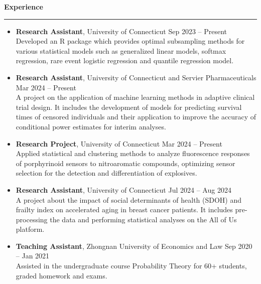 \documentclass[a4paper,10pt]{article}
\newcommand{\resheading}[1]{
  \vspace{8pt}
  \noindent\textbf{\large #1}
  \vspace{4pt}
  \hrule
  \vspace{8pt}
}
\begin{document}
\resheading{Experience}
\begin{itemize}[left=0pt, label={}]

    \item \textbf{Research Assistant}, University of Connecticut \hfill Sep 2023 -- Present \\
    Developed an R package which provides optimal subsampling methods for
various statistical models such as generalized linear models, softmax
regression, rare event logistic regression and quantile regression model.

    \item \textbf{Research Assistant}, University of Connecticut and Servier Pharmaceuticals \hfill Mar 2024 -- Present \\
    A project on the application of machine learning methods in adaptive
clinical trial design. It includes the development of models for predicting
survival times of censored individuals and their application to improve the
accuracy of conditional power estimates for interim analyses.

   \item \textbf{Research Project}, University of Connecticut \hfill Mar 2024 -- Present \\
Applied statistical and clustering methods to analyze fluorescence responses of porphyrinoid sensors to nitroaromatic compounds, optimizing sensor selection for the detection and differentiation of explosives.
      
    \item \textbf{Research Assistant}, University of Connecticut \hfill Jul 2024 -- Aug 2024 \\
    A project about the impact of social determinants of health (SDOH) and
frailty index on accelerated aging in breast cancer patients. It includes
pre-processing the data and performing statistical analyses on the All of Us
platform.
    
    \item \textbf{Teaching Assistant}, Zhongnan University of Economics and Law \hfill Sep 2020 -- Jan 2021 \\
    Assisted in the undergraduate course Probability Theory for 60+ students,
graded homework and exams.
  \end{itemize}
  
\end{document}
